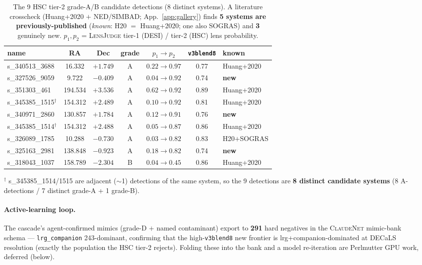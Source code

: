 \documentclass[11pt,letterpaper]{article}
\newcommand{\cnet}{\textsc{ClaudeNet}}
\newcommand{\lj}{\textsc{LensJudge}}
\newcommand{\vb}{\texttt{v3blend8}}
\begin{document}
\begin{table}[t]\centering
\caption{The 9 HSC tier-2 grade-A/B candidate detections (8 distinct systems). A literature crosscheck
(Huang+2020 $+$ NED/SIMBAD; App.~\ref{app:gallery}) finds \textbf{5 systems are previously-published}
(\emph{known}: H20 $=$ Huang+2020; one also SOGRAS) and \textbf{3} genuinely new. $p_1,p_2$ = \lj{}
tier-1 (DESI) / tier-2 (HSC) lens probability.}
\label{tab:confirmed}
\begin{tabular}{lcccccl}
\toprule
name & RA & Dec & grade & $p_1\!\to\!p_2$ & \vb{} & known\\
\midrule
s\_340513\_3688 & 16.332 & $+1.749$  & A & $0.22\to0.97$ & 0.77 & Huang+2020\\
s\_327526\_9059 & 9.722  & $-0.409$  & A & $0.04\to0.92$ & 0.74 & \textbf{new}\\
s\_351303\_461  & 194.534& $+3.536$  & A & $0.62\to0.92$ & 0.89 & Huang+2020\\
s\_345385\_1515$^{\dagger}$ & 154.312 & $+2.489$ & A & $0.10\to0.92$ & 0.81 & Huang+2020\\
s\_340971\_2860 & 130.857& $+1.784$  & A & $0.12\to0.91$ & 0.76 & \textbf{new}\\
s\_345385\_1514$^{\dagger}$ & 154.312 & $+2.488$ & A & $0.05\to0.87$ & 0.86 & Huang+2020\\
s\_326089\_1785 & 10.288 & $-0.730$  & A & $0.03\to0.82$ & 0.83 & H20$+$SOGRAS\\
s\_325163\_2981 & 138.848& $-0.923$  & A & $0.18\to0.82$ & 0.74 & \textbf{new}\\
s\_318043\_1037 & 158.789& $-2.304$  & B & $0.04\to0.45$ & 0.86 & Huang+2020\\
\bottomrule
\end{tabular}

\smallskip
{\footnotesize $^{\dagger}$ s\_345385\_1514/1515 are adjacent ($\sim$1\arcsec) detections of the same
system, so the 9 detections are \textbf{8 distinct candidate systems} (8 A-detections / 7 distinct
grade-A + 1 grade-B).}
\end{table}

\paragraph{Active-learning loop.} The cascade's agent-confirmed mimics (grade-D $+$ named contaminant)
export to \textbf{291} hard negatives in the \cnet{} mimic-bank schema --- \texttt{lrg\_companion}
243-dominant, confirming that the high-\vb{} new frontier is lrg+companion-dominated at DECaLS
resolution (exactly the population the HSC tier-2 rejects). Folding these into the bank and a model
re-iteration are Perlmutter GPU work, deferred (below).
\end{document}
